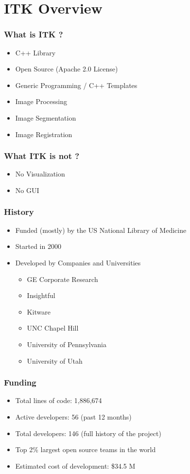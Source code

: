 \section{ITK Overview}



\begin{frame}
\frametitle{What is ITK ?}
\begin{itemize}
\item C++ Library
\pause
\item Open Source (Apache 2.0 License)
\pause
\item Generic Programming / C++ Templates
\pause
\item Image Processing
\pause
\item Image Segmentation
\pause
\item Image Registration
\end{itemize}
\end{frame}


\begin{frame}
\frametitle{What ITK is not ?}
\begin{itemize}
\item No Visualization
\pause
\item No GUI
\end{itemize}
\end{frame}


\begin{frame}
\frametitle{History}
\begin{itemize}
\item Funded (mostly) by the US National Library of Medicine
\pause
\item Started in 2000
\pause
\item Developed by Companies and Universities
\begin{itemize}
\item GE Corporate Research
\item Insightful
\item Kitware
\item UNC Chapel Hill
\item University of Pennsylvania
\item University of Utah
\end{itemize}
\end{itemize}
\end{frame}

\begin{frame}
\frametitle{Funding}
\begin{itemize}
\item Total lines of code: 1,886,674
\item Active developers: 56 (past 12 months)
\item Total developers: 146 (full history of the project)
\item Top 2\% largest open source teams in the world
\item Estimated cost of development: \$34.5 M
\end{itemize}
\end{frame}

